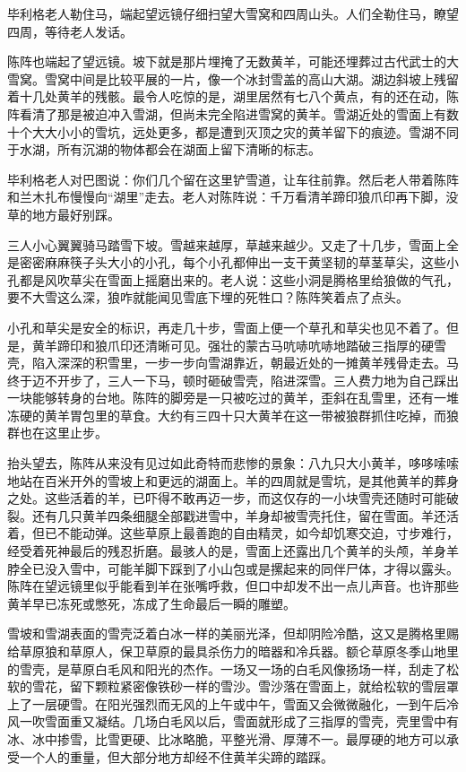 \par 毕利格老人勒住马，端起望远镜仔细扫望大雪窝和四周山头。人们全勒住马，瞭望四周，等待老人发话。
\par 陈阵也端起了望远镜。坡下就是那片埋掩了无数黄羊，可能还埋葬过古代武士的大雪窝。雪窝中间是比较平展的一片，像一个冰封雪盖的高山大湖。湖边斜坡上残留着十几处黄羊的残骸。最令人吃惊的是，湖里居然有七八个黄点，有的还在动，陈阵看清了那是被迫冲入雪湖，但尚未完全陷进雪窝的黄羊。雪湖近处的雪面上有数十个大大小小的雪坑，远处更多，都是遭到灭顶之灾的黄羊留下的痕迹。雪湖不同于水湖，所有沉湖的物体都会在湖面上留下清晰的标志。
\par 毕利格老人对巴图说：你们几个留在这里铲雪道，让车往前靠。然后老人带着陈阵和兰木扎布慢慢向“湖里”走去。老人对陈阵说：千万看清羊蹄印狼爪印再下脚，没草的地方最好别踩。
\par 三人小心翼翼骑马踏雪下坡。雪越来越厚，草越来越少。又走了十几步，雪面上全是密密麻麻筷子头大小的小孔，每个小孔都伸出一支干黄坚韧的草茎草尖，这些小孔都是风吹草尖在雪面上摇磨出来的。老人说：这些小洞是腾格里给狼做的气孔，要不大雪这么深，狼咋就能闻见雪底下埋的死牲口？陈阵笑着点了点头。
\par 小孔和草尖是安全的标识，再走几十步，雪面上便一个草孔和草尖也见不着了。但是，黄羊蹄印和狼爪印还清晰可见。强壮的蒙古马吭哧吭哧地踏破三指厚的硬雪壳，陷入深深的积雪里，一步一步向雪湖靠近，朝最近处的一摊黄羊残骨走去。马终于迈不开步了，三人一下马，顿时砸破雪壳，陷进深雪。三人费力地为自己踩出一块能够转身的台地。陈阵的脚旁是一只被吃过的黄羊，歪斜在乱雪里，还有一堆冻硬的黄羊胃包里的草食。大约有三四十只大黄羊在这一带被狼群抓住吃掉，而狼群也在这里止步。
\par 抬头望去，陈阵从来没有见过如此奇特而悲惨的景象：八九只大小黄羊，哆哆嗦嗦地站在百米开外的雪坡上和更远的湖面上。羊的四周就是雪坑，是其他黄羊的葬身之处。这些活着的羊，已吓得不敢再迈一步，而这仅存的一小块雪壳还随时可能破裂。还有几只黄羊四条细腿全部戳进雪中，羊身却被雪壳托住，留在雪面。羊还活着，但已不能动弹。这些草原上最善跑的自由精灵，如今却饥寒交迫，寸步难行，经受着死神最后的残忍折磨。最骇人的是，雪面上还露出几个黄羊的头颅，羊身羊脖全已没入雪中，可能羊脚下踩到了小山包或是摞起来的同伴尸体，才得以露头。陈阵在望远镜里似乎能看到羊在张嘴呼救，但口中却发不出一点儿声音。也许那些黄羊早已冻死或憋死，冻成了生命最后一瞬的雕塑。
\par 雪坡和雪湖表面的雪壳泛着白冰一样的美丽光泽，但却阴险冷酷，这又是腾格里赐给草原狼和草原人，保卫草原的最具杀伤力的暗器和冷兵器。额仑草原冬季山地里的雪壳，是草原白毛风和阳光的杰作。一场又一场的白毛风像扬场一样，刮走了松软的雪花，留下颗粒紧密像铁砂一样的雪沙。雪沙落在雪面上，就给松软的雪层罩上了一层硬雪。在阳光强烈而无风的上午或中午，雪面又会微微融化，一到午后冷风一吹雪面重又凝结。几场白毛风以后，雪面就形成了三指厚的雪壳，壳里雪中有冰、冰中掺雪，比雪更硬、比冰略脆，平整光滑、厚薄不一。最厚硬的地方可以承受一个人的重量，但大部分地方却经不住黄羊尖蹄的踏踩。
